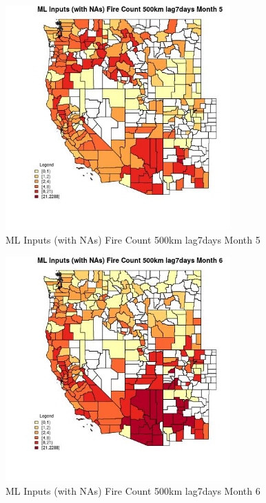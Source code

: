 \begin{figure} 
\centering  
\includegraphics[width=0.77\textwidth]{Code_Outputs/Report_ML_input_PM25_Step4_part_e_de_duplicated_aves_compiled_2019-05-21wNAs_CountyFire_Count_500km_lag7daysmedianMonth5.jpg} 
\caption{\label{fig:Report_ML_input_PM25_Step4_part_e_de_duplicated_aves_compiled_2019-05-21wNAsCountyFire_Count_500km_lag7daysmedianMonth5}ML Inputs (with NAs) Fire Count 500km lag7days Month 5} 
\end{figure} 
 

\begin{figure} 
\centering  
\includegraphics[width=0.77\textwidth]{Code_Outputs/Report_ML_input_PM25_Step4_part_e_de_duplicated_aves_compiled_2019-05-21wNAs_CountyFire_Count_500km_lag7daysmedianMonth6.jpg} 
\caption{\label{fig:Report_ML_input_PM25_Step4_part_e_de_duplicated_aves_compiled_2019-05-21wNAsCountyFire_Count_500km_lag7daysmedianMonth6}ML Inputs (with NAs) Fire Count 500km lag7days Month 6} 
\end{figure} 
 

